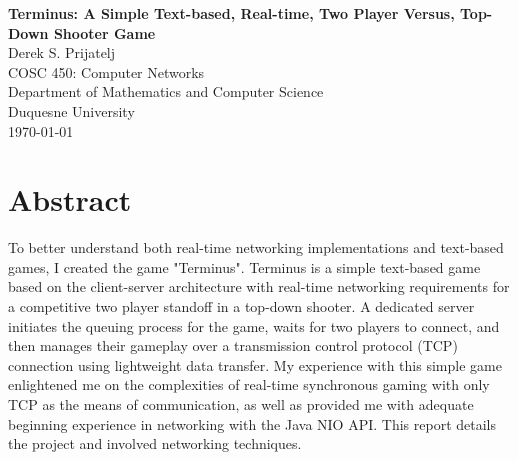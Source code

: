 \documentclass[12pt]{article}
\begin{document}
\begin{titlepage}
\begin{center}
        \large
        \textbf{Terminus: A Simple Text-based, Real-time, Two Player Versus, Top-Down Shooter Game}\\
        \normalsize
        \vspace{0.5cm}
        Derek S. Prijatelj\\
        COSC 450: Computer Networks\\
        Department of Mathematics and Computer Science\\
        Duquesne University\\
        \today\\
    \end{center}
\section*{Abstract}
    To better understand both real-time networking implementations and text-based games, I created the game "Terminus". Terminus is a simple text-based game based on the client-server architecture with real-time networking requirements for a competitive two player standoff in a top-down shooter. A dedicated server initiates the queuing process for the game, waits for two players to connect, and then manages their gameplay over a transmission control protocol (TCP) connection using lightweight data transfer. My experience with this simple game enlightened me on the complexities of real-time synchronous gaming with only TCP as the means of communication, as well as provided me with adequate beginning experience in networking with the Java NIO API. This report details the project and involved networking techniques.

\end{titlepage}
\pagestyle{fancy}
\end{document}
